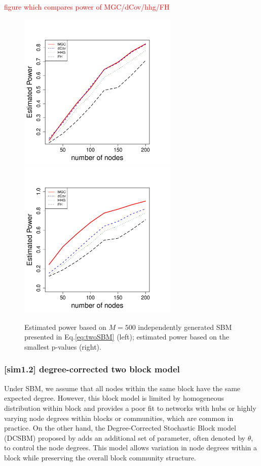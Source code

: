 \documentclass[12pt]{article}
\theoremstyle{definition}
\begin{document}
\textcolor{red}{figure which compares power of MGC/dCov/hhg/FH}

\begin{figure}[H]
	\centering
	\label{fig:twoSBM}
	\includegraphics[width=3in]{../Figure/tmp_twoSBM.pdf}
	\includegraphics[width=3in]{../Figure/tmp_twoSBM2.pdf}
	\caption{Estimated power based on $M = 500$ independently generated SBM presented in Eq.\ref{eq:twoSBM} (left); estimated power based on the smallest p-values (right). }
\end{figure}


\subsubsection{[sim1.2] degree-corrected two block model}

Under SBM, we assume that all nodes within the same block have the same expected degree. However, this block model is limited by homogeneous distribution within block and provides a poor fit to networks with hubs or highly varying node degrees within blocks or communities, which are common in practice. On the other hand, the Degree-Corrected Stochastic Block model (DCSBM) proposed by \cite{karrer2011stochastic} adds an additional set of parameter, often denoted by $\theta$, to control the node degrees. This model allows variation in node degrees within a block while preserving the overall block community structure. 
\end{document}
